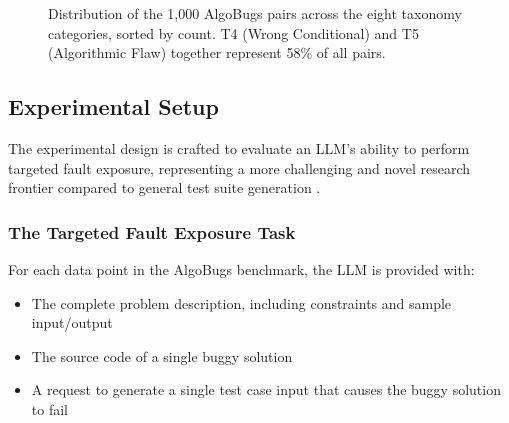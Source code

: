 \begin{figure}[h!]
\centering
{}
\caption{Distribution of the 1,000 AlgoBugs pairs across the eight taxonomy categories, sorted by count. T4 (Wrong Conditional) and T5 (Algorithmic Flaw) together represent 58\% of all pairs.}
\label{fig:taxonomy_dist}
\end{figure}

\subsection{Experimental Setup}

The experimental design is crafted to evaluate an LLM's ability to perform targeted fault exposure, representing a more challenging and novel research frontier compared to general test suite generation \cite{yang2025testcase, cao2025tcgbench}.

\subsubsection{The Targeted Fault Exposure Task}

For each data point in the AlgoBugs benchmark, the LLM is provided with:

\begin{itemize}
    \item The complete problem description, including constraints and sample input/output
    \item The source code of a single buggy solution
    \item A request to generate a single test case input that causes the buggy solution to fail
\end{itemize}

